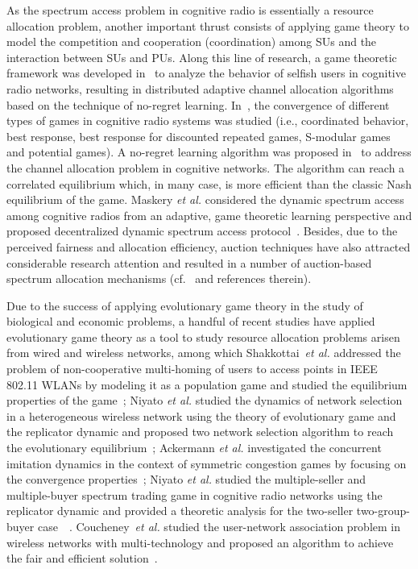 \documentclass[12pt, onecolumn]{IEEEtran}
\theoremstyle{plain}
\theoremstyle{definition}
\begin{document}
As the spectrum access problem in cognitive radio is essentially a resource allocation problem, another important thrust consists of applying game theory to model the competition and cooperation (coordination) among SUs and the interaction between SUs and PUs. Along this line of research, a game theoretic framework was developed in~\cite{Nie06} to analyze the behavior of selfish users in cognitive radio networks, resulting in distributed adaptive channel allocation algorithms based on the technique of no-regret learning. In~\cite{Neel04}, the convergence of different types of games in cognitive radio systems was studied (i.e., coordinated behavior, best response, best response for discounted repeated games, S-modular games and potential games). A no-regret learning algorithm was proposed in~\cite{Han07} to address the channel allocation problem in cognitive networks. The algorithm can reach a correlated equilibrium which, in many case, is more efficient than the classic Nash equilibrium of the game. Maskery \textit{et al.} considered the dynamic spectrum access among cognitive radios from an adaptive, game theoretic learning perspective and proposed decentralized dynamic spectrum access protocol~\cite{Maskery09}. Besides, due to the perceived fairness and allocation efficiency, auction techniques have also attracted considerable research attention and resulted in a number of auction-based spectrum allocation mechanisms (cf.~\cite{infocom10} and references therein).

Due to the success of applying evolutionary game theory in the study of biological and economic problems, a handful of recent studies have applied evolutionary game theory as a tool to study resource allocation problems arisen from wired and wireless networks, among which Shakkottai~\textit{et al.} addressed the problem of non-cooperative multi-homing of users to access points in IEEE 802.11 WLANs by modeling it as a population game and studied the equilibrium properties of the game~\cite{Shakkottai07}; Niyato \textit{et al.} studied the dynamics of network selection in a heterogeneous wireless network using the theory of evolutionary game and the replicator dynamic and proposed two network selection algorithm to reach the evolutionary equilibrium~\cite{Niyato09}; Ackermann \textit{et al.} investigated the concurrent imitation dynamics in the context of symmetric congestion games by focusing on the convergence properties~\cite{Ackermann09}; Niyato \textit{et al.} studied the multiple-seller and multiple-buyer spectrum trading game in cognitive radio networks using the replicator dynamic and provided a theoretic analysis for the two-seller two-group-buyer case~~\cite{Niyato09b}. Coucheney~\textit{et al.} studied the user-network association problem in wireless networks with multi-technology and proposed an algorithm to achieve the fair and efficient solution~\cite{Cou09}.
\end{document}
